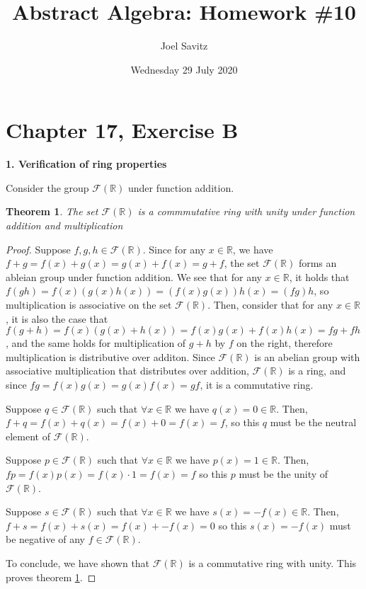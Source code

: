 \documentclass[12pt]{article}
\title{Abstract Algebra: Homework \#10}
\author{Joel Savitz}
\date{Wednesday 29 July 2020}
\newcommand{\reals}{\mathbb{R}}
\newcommand{\freals}{\mathcal{F}(\reals)}
\newtheorem{thm}{Theorem}
\begin{document}
\maketitle

\section{Chapter 17, Exercise B}

\textbf{1. Verification of ring properties}

Consider the group $\freals$ under function addition.

\begin{thm} \label{thm1}
	The set $\freals$ is a commmutative ring with unity under function addition and multiplication
\end{thm}

\begin{proof}
	Suppose $f,g,h \in \freals$.
	Since for any $x \in \reals$, we have $f + g = f(x) + g(x) = g(x) + f(x) = g + f$,
	the set $\freals$ forms an ableian group under function addition.
	We see that for any $x \in \reals$, it holds that $f(gh) = f(x)(g(x)h(x)) = (f(x)g(x))h(x) = (fg)h$,
	so multiplication is associative on the set $\freals$.
	Then, consider that for any $x \in \reals$,
	it is also the case that $f(g + h) = f(x)(g(x) + h(x)) = f(x)g(x) + f(x)h(x) = fg + fh$,
	and the same holds for multiplication of $g + h$ by $f$ on the right,
	therefore multiplication is distributive over additon.
	Since $\freals$ is an abelian group with associative multiplication that distributes over addition,
	$\freals$ is a ring, and since $fg = f(x)g(x) = g(x)f(x) = gf$, it is a commutative ring.

	Suppose $q \in \freals$ such that $\forall x \in \reals$ we have $q(x) = 0 \in \reals$.
	Then, $f + q = f(x) + q(x) = f(x) + 0 = f(x) = f$,
	so this $q$ must be the neutral element of $\freals$.

	Suppose $p \in \freals$ such that $\forall x \in \reals$ we have $p(x) = 1 \in \reals$.
	Then, $fp = f(x)p(x) = f(x)\cdot 1  = f(x) = f$
	so this $p$ must be the unity of $\freals$.

	Suppose $s \in \freals$ such that $\forall x \in \reals$ we have $s(x) = -f(x) \in \reals$.
	Then, $f + s = f(x) + s(x) = f(x) + -f(x) = 0$
	so this $s(x) = -f(x) $ must be negative of any $f \in \freals$.

	To conclude, we have shown that $\freals$ is a commutative ring with unity.
	This proves theorem \ref{thm1}.
\end{proof}
\end{document}
